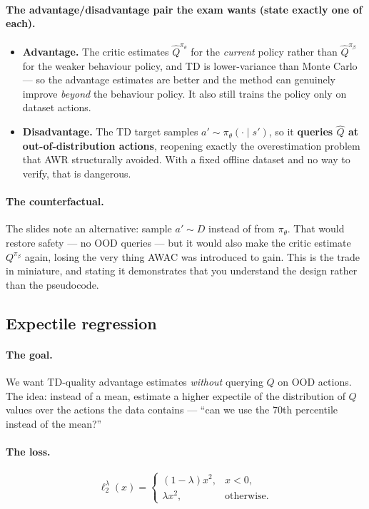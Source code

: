 \documentclass[11pt,a4paper]{article}
\begin{document}
\paragraph{The advantage/disadvantage pair the exam wants (state exactly one of each).}
\begin{itemize}
\item \textbf{Advantage.} The critic estimates $\hat Q^{\pi_\theta}$ for the
\emph{current} policy rather than $\hat Q^{\pi_\beta}$ for the weaker
behaviour policy, and TD is lower-variance than Monte Carlo --- so the
advantage estimates are better and the method can genuinely improve
\emph{beyond} the behaviour policy. It also still trains the policy only on
dataset actions.
\item \textbf{Disadvantage.} The TD target samples $a'\sim\pi_\theta(\cdot\mid s')$,
so it \textbf{queries $\hat Q$ at out-of-distribution actions}, reopening
exactly the overestimation problem that AWR structurally avoided. With a
fixed offline dataset and no way to verify, that is dangerous.
\end{itemize}

\paragraph{The counterfactual.} The slides note an alternative: sample
$a'\sim D$ instead of from $\pi_\theta$. That would restore safety --- no OOD
queries --- but it would also make the critic estimate $Q^{\pi_\beta}$ again,
losing the very thing AWAC was introduced to gain. This is the trade in
miniature, and stating it demonstrates that you understand the design rather
than the pseudocode.

\subsection{Expectile regression}

\paragraph{The goal.} We want TD-quality advantage estimates \emph{without}
querying $Q$ on OOD actions. The idea: instead of a mean, estimate a higher
expectile of the distribution of $Q$ values over the actions the data
contains --- ``can we use the 70th percentile instead of the mean?''

\paragraph{The loss.}
\[
\ell_2^{\lambda}(x)=
\begin{cases}
(1-\lambda)x^2, & x<0,\\
\lambda x^2, & \text{otherwise.}
\end{cases}
\]
\end{document}

